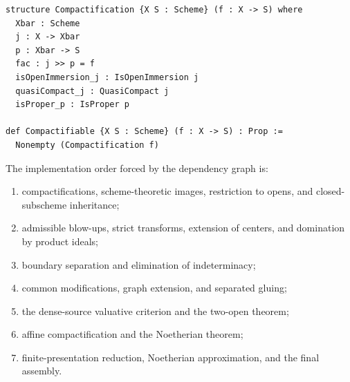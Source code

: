 \begin{verbatim}
structure Compactification {X S : Scheme} (f : X -> S) where
  Xbar : Scheme
  j : X -> Xbar
  p : Xbar -> S
  fac : j >> p = f
  isOpenImmersion_j : IsOpenImmersion j
  quasiCompact_j : QuasiCompact j
  isProper_p : IsProper p

def Compactifiable {X S : Scheme} (f : X -> S) : Prop :=
  Nonempty (Compactification f)
\end{verbatim}

The implementation order forced by the dependency graph is:
\begin{enumerate}
  \item compactifications, scheme-theoretic images, restriction to opens, and
    closed-subscheme inheritance;
  \item admissible blow-ups, strict transforms, extension of centers, and
    domination by product ideals;
  \item boundary separation and elimination of indeterminacy;
  \item common modifications, graph extension, and separated gluing;
  \item the dense-source valuative criterion and the two-open theorem;
  \item affine compactification and the Noetherian theorem;
  \item finite-presentation reduction, Noetherian approximation, and the final
    assembly.
\end{enumerate}

